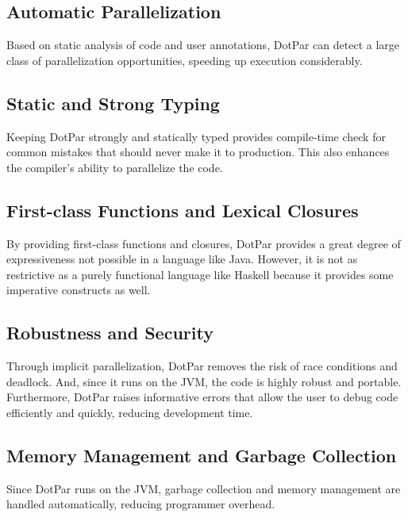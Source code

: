 \subsection{Automatic Parallelization}
Based on static analysis of code and user annotations, DotPar can
detect a large class of parallelization opportunities, speeding up
execution considerably.

\subsection{Static and Strong Typing}
Keeping DotPar strongly and statically typed provides compile-time
check for common mistakes that should never make it to
production. This also enhances the compiler’s ability to parallelize
the code.

\subsection{First-class Functions and Lexical Closures}
By providing first-class functions and closures, DotPar provides a
great degree of expressiveness not possible in a language like
Java. However, it is not as restrictive as a purely functional
language like Haskell because it provides some imperative constructs
as well.

\subsection{Robustness and Security}
Through implicit parallelization, DotPar removes the risk of race
conditions and deadlock.  And, since it runs on the JVM, the code is
highly robust and portable. Furthermore, DotPar raises informative
errors that allow the user to debug code efficiently and quickly,
reducing development time.

\subsection{Memory Management and Garbage Collection}
Since DotPar runs on the JVM, garbage collection and memory management
are handled automatically, reducing programmer overhead.